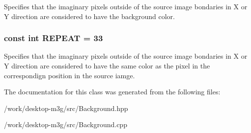 Specifies that the imaginary pixels outside of the source image bondaries in X or Y direction are considered to have the background color. \hypertarget{classm3g_1_1Background_a466d02b3d88f856854d0a0955be32e8}{
\subsubsection[{REPEAT}]{\setlength{\rightskip}{0pt plus 5cm}const int {\bf REPEAT} = 33}}
\label{classm3g_1_1Background_a466d02b3d88f856854d0a0955be32e8}


Specifies that the imaginary pixels outside of the source image bondaries in X or Y direction are considered to have the same color as the pixel in the correspondign position in the source iamge. 

The documentation for this class was generated from the following files:\begin{CompactItemize}
\item 
/work/desktop-m3g/src/Background.hpp\item 
/work/desktop-m3g/src/Background.cpp\end{CompactItemize}
